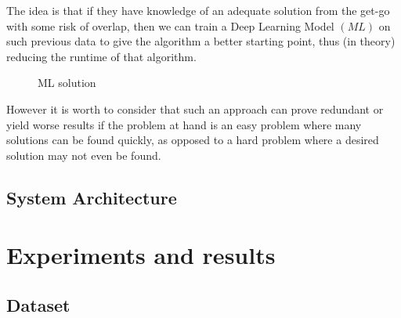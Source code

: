 \documentclass[12pt,a4paper]{report}
\begin{document}
The idea is that if they have knowledge of an adequate solution from the get-go with some risk of overlap, then we can train a Deep Learning Model $(M\!L)$ on such previous data to give the algorithm a better starting point, thus (in theory) reducing the runtime of that algorithm.

\begin{figure}[ht]
    \centering
    \caption{ML solution}
    \label{fig:ml_solution}
\end{figure}

However it is worth to consider that such an approach can prove redundant or yield worse results if the problem at hand is an easy problem where many solutions can be found quickly, as opposed to a hard problem where a desired solution may not even be found. 

\section{System Architecture}
\chapter{Experiments and results}
\section{Dataset}
\end{document}
